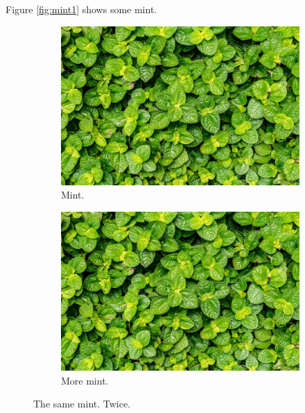 \documentclass{book}
\begin{document}
Figure \ref{fig:mint1} shows some mint.

\begin{figure}[h!]
  \centering
  \begin{subfigure}[b]{0.4\linewidth}
    \includegraphics[width=\linewidth]{mint.jpg}
    \caption{Mint.}
  \end{subfigure}
  \begin{subfigure}[b]{0.4\linewidth}
    \includegraphics[width=\linewidth]{mint.jpg}
    \caption{More mint.}
  \end{subfigure}
  \caption{The same mint. Twice.}
  \label{fig:mints1}
\end{figure}

\paragraph{} 
\end{document}
